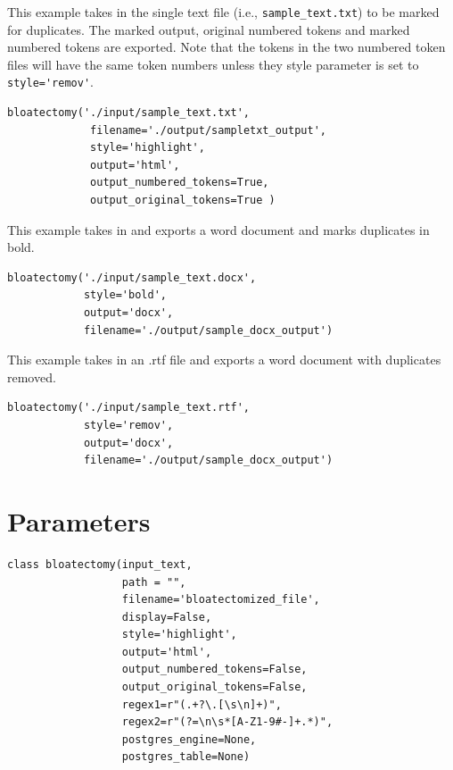 \documentclass[runningheads,a4paper]{llncs}
\begin{document}
\medskip

\noindent This example takes in the single text file (i.e., \verb|sample_text.txt|) to be marked for duplicates. The marked output, original numbered tokens and marked numbered tokens are exported. Note that the tokens in the two numbered token files will have the same token numbers unless they style parameter is set to \verb|style='remov'|.

\begin{lstlisting}[frame=single, style=customcode]
bloatectomy('./input/sample_text.txt',
             filename='./output/sampletxt_output',
             style='highlight',
             output='html',
             output_numbered_tokens=True,
             output_original_tokens=True )
\end{lstlisting}

\medskip

\noindent This example takes in and exports a word document and marks duplicates in bold. 

\begin{lstlisting}[frame=single, style=customcode]
bloatectomy('./input/sample_text.docx',
            style='bold',
            output='docx',
            filename='./output/sample_docx_output')
\end{lstlisting}

\medskip

\noindent This example takes in an .rtf file and exports a word document with duplicates removed.
 
\begin{lstlisting}[frame=single, style=customcode]
bloatectomy('./input/sample_text.rtf',
            style='remov',
            output='docx',
            filename='./output/sample_docx_output')
\end{lstlisting}



\section{Parameters}  
\begin{lstlisting}[frame=single, style=customcode]
class bloatectomy(input_text,
                  path = "",
                  filename='bloatectomized_file',
                  display=False,
                  style='highlight',
                  output='html',
                  output_numbered_tokens=False,
                  output_original_tokens=False,
                  regex1=r"(.+?\.[\s\n]+)",
                  regex2=r"(?=\n\s*[A-Z1-9#-]+.*)",
                  postgres_engine=None,
                  postgres_table=None)
\end{lstlisting}
\end{document}
